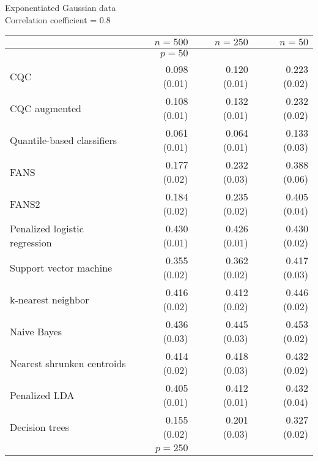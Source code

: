 \begin{table}[p]
  \centering
  Exponentiated Gaussian data \\
  Correlation coefficient = 0.8 \\[2ex]
  \begin{adjustbox}{max size={\textwidth}{10cm}}
    \begin{tabular}{l@{\extracolsep{15mm}}rrr}
      
      \hline
      & $n=500$ & $n=250$ & $n=50$ \\ 
      \hline
      & $p = 50$ \\
      \hline

      CQC & 0.098 (0.01) & 0.120 (0.01) & 0.223 (0.02) \\ 
      CQC augmented & 0.108 (0.01) & 0.132 (0.01) & 0.232 (0.02) \\ 
      Quantile-based classifiers & 0.061 (0.01) & 0.064 (0.01) & 0.133 (0.03) \\ 
      FANS  & 0.177 (0.02) & 0.232 (0.03) & 0.388 (0.06) \\
      FANS2 & 0.184 (0.02) & 0.235 (0.02) & 0.405 (0.04) \\
      Penalized logistic regression & 0.430 (0.01) & 0.426 (0.01) & 0.430 (0.02) \\ 
      Support vector machine & 0.355 (0.02) & 0.362 (0.02) & 0.417 (0.03) \\ 
      k-nearest neighbor & 0.416 (0.02) & 0.412 (0.02) & 0.446 (0.02) \\ 
      Naive Bayes & 0.436 (0.03) & 0.445 (0.03) & 0.453 (0.02) \\ 
      Nearest shrunken centroids & 0.414 (0.02) & 0.418 (0.03) & 0.432 (0.02) \\ 
      Penalized LDA & 0.405 (0.01) & 0.412 (0.01) & 0.432 (0.04) \\ 
      Decision trees & 0.155 (0.02) & 0.201 (0.03) & 0.327 (0.02) \\ [2ex]

      \hline
      & $p = 250$ \\
      \hline


\end{tabular}
\end{adjustbox}
\end{table}
